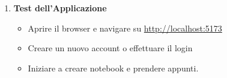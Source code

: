 \begin{enumerate}
    Installare le dipendenze:
    \begin{verbatim}
npm install
    \end{verbatim}
    
    Creare il file \texttt{.env}:
    \begin{verbatim}
touch .env
    \end{verbatim}
    
    Configurare il file \texttt{.env}:
    \begin{verbatim}
VITE_BACKEND_URL=http://localhost:3000
VITE_VAPID_PUBLIC_KEY=your_vapid_public_key_here
    \end{verbatim}
    
    Avviare il server di sviluppo:
    \begin{verbatim}
npm run dev
    \end{verbatim}
    
    Il frontend sarà disponibile su \url{http://localhost:5173}.

    \item \textbf{Test dell'Applicazione}
    \begin{itemize}
        \item Aprire il browser e navigare su \url{http://localhost:5173}
        \item Creare un nuovo account o effettuare il login
        \item Iniziare a creare notebook e prendere appunti.
    \end{itemize}
\end{enumerate}

